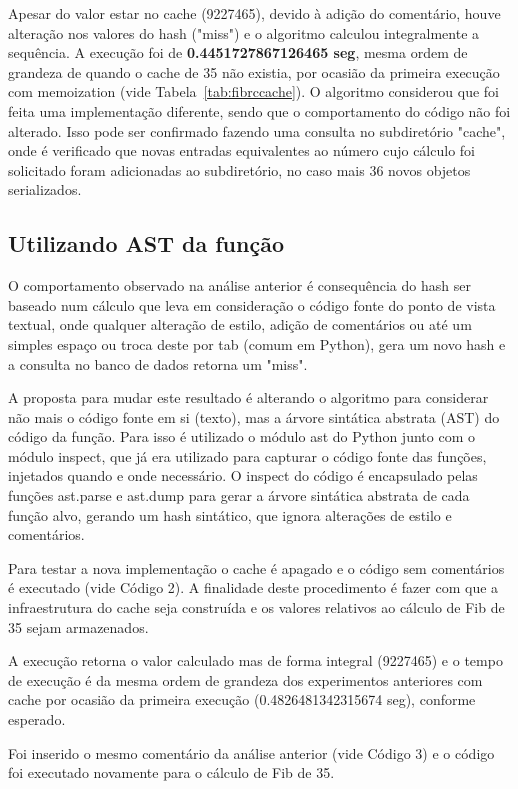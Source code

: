 \documentclass[sigconf]{acmart}
\begin{document}
Apesar do valor estar no cache (9227465), devido à adição do comentário, houve alteração nos valores do hash ("miss") e o algoritmo calculou integralmente a sequência. A execução foi de \textbf{0.4451727867126465 seg}, mesma ordem de grandeza de quando o cache de 35 não existia, por ocasião da primeira execução com memoization (vide Tabela~\ref{tab:fibrccache}). O algoritmo considerou que foi feita uma implementação diferente, sendo que o comportamento do código não foi alterado. Isso pode ser confirmado fazendo uma consulta no subdiretório "cache", onde é verificado que novas entradas equivalentes ao número cujo cálculo foi solicitado foram adicionadas ao subdiretório, no caso mais 36 novos objetos serializados.

\subsection{Utilizando AST da função}
O comportamento observado na análise anterior é consequência do hash ser baseado num cálculo que leva em consideração o código fonte do ponto de vista textual, onde qualquer alteração de estilo, adição de comentários ou até um simples espaço ou troca deste por tab (comum em Python), gera um novo hash e a consulta no banco de dados retorna um "miss". 

A proposta para mudar este resultado é alterando o algoritmo para considerar não mais o código fonte em si (texto), mas a árvore sintática abstrata \cite{aho1986compilers}(AST) do código da função. Para isso é utilizado o módulo ast do Python junto com o módulo inspect, que já era utilizado para capturar o código fonte das funções, injetados quando e onde necessário. O inspect do código é encapsulado pelas funções ast.parse e ast.dump para gerar a árvore sintática abstrata de cada função alvo, gerando um hash sintático, que ignora alterações de estilo e comentários.

Para testar a nova implementação o cache é apagado e o código sem comentários é executado (vide Código 2). A finalidade deste procedimento é fazer com que a infraestrutura do cache seja construída e os valores relativos ao cálculo de Fib de 35 sejam armazenados.

A execução retorna o valor calculado mas de forma integral (9227465) e o tempo de execução é da mesma ordem de grandeza dos experimentos anteriores com cache por ocasião da primeira execução (0.4826481342315674 seg), conforme esperado.

Foi inserido o mesmo comentário da análise anterior (vide Código 3) e o código foi executado novamente para o cálculo de Fib de 35.
\end{document}
